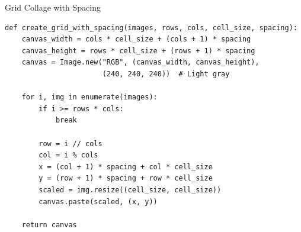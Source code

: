\documentclass{csbeamer}
\begin{document}
\begin{frame}[fragile]{Grid Collage with Spacing}
    \begin{lstlisting}
def create_grid_with_spacing(images, rows, cols, cell_size, spacing):
    canvas_width = cols * cell_size + (cols + 1) * spacing
    canvas_height = rows * cell_size + (rows + 1) * spacing
    canvas = Image.new("RGB", (canvas_width, canvas_height),
                       (240, 240, 240))  # Light gray

    for i, img in enumerate(images):
        if i >= rows * cols:
            break

        row = i // cols
        col = i % cols
        x = (col + 1) * spacing + col * cell_size
        y = (row + 1) * spacing + row * cell_size
        scaled = img.resize((cell_size, cell_size))
        canvas.paste(scaled, (x, y))

    return canvas
    \end{lstlisting}
\end{frame}
\end{document}
